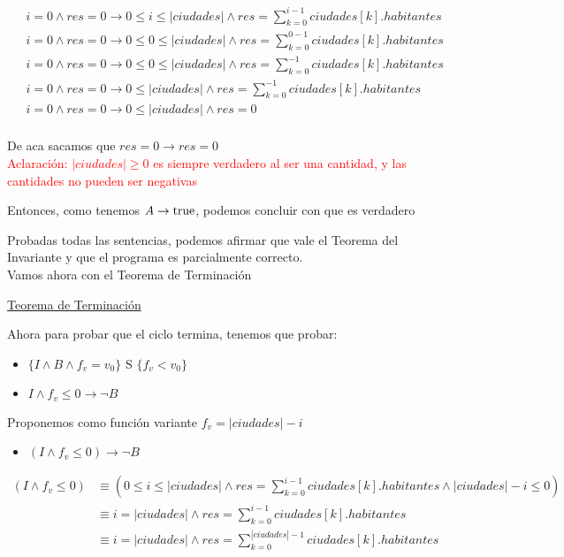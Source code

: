 \documentclass[10pt,a4paper]{article}
\begin{document}
\begin {enumerate}
    \begin{align*}
        &i = 0 \land res = 0 \to 0 \leq i \leq |ciudades| \land res = \sum\limits_{k=0}^{i - 1}{ciudades[k].habitantes} \\
        &i = 0 \land res = 0 \to 0 \leq 0 \leq |ciudades| \land res = \sum\limits_{k=0}^{0 - 1}{ciudades[k].habitantes} \\
        &i = 0 \land res = 0 \to 0 \leq 0 \leq |ciudades| \land res = \sum\limits_{k=0}^{-1}{ciudades[k].habitantes} \\
        &i = 0 \land res = 0 \to  0 \leq |ciudades| \land res = \sum\limits_{k=0}^{-1}{ciudades[k].habitantes} \\
        &i = 0 \land res = 0 \to  0 \leq |ciudades| \land res = 0 \\
    \end{align*}

    De aca sacamos que $res = 0 \to res = 0$ \\
    \textcolor{red}{Aclaración: $|ciudades| \geq 0$ es siempre verdadero al ser una cantidad, y las cantidades no pueden ser negativas}

    Entonces, como tenemos $A \to \mathrm{true}$, podemos concluir con que es verdadero

    Probadas todas las sentencias, podemos afirmar que vale el Teorema del Invariante y que el programa es parcialmente correcto.\\
    Vamos ahora con el Teorema de Terminación

    \underline{Teorema de Terminación}




    Ahora para probar que el ciclo termina, tenemos que probar:

    \begin{itemize}
        \item $\{ I \land B \land f_{v} = v_{0}  \}$ S $\{f_{v} < v_{0}\}$  
        \item $ I \land f_{v} \leq 0 \to \neg B$
    \end{itemize}

    Proponemos como función variante $f_{v} = |ciudades| - i$

    \begin{itemize}
        \item 
            $(I \land f_{v} \leq 0) \to \neg B$
    \end{itemize}

    \begin{align*}
        (I \land f_{v} \leq 0) &\equiv (0 \leq i \leq |ciudades| \land res = \sum\limits_{k=0}^{i -1}{ciudades[k].habitantes} \land |ciudades| - i \leq 0) \\
        &\equiv i = |ciudades| \land res = \sum\limits_{k=0}^{i -1}{ciudades[k].habitantes} \\
        &\equiv i = |ciudades| \land res = \sum\limits_{k=0}^{|ciudades| -1}{ciudades[k].habitantes}
    \end{align*}



\end{enumerate}
\end{document}
